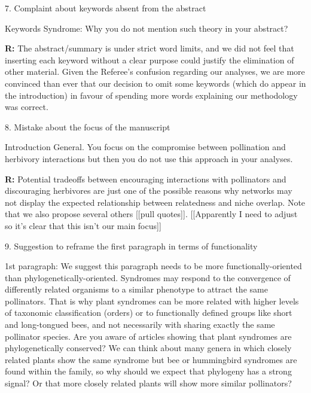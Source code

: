 \documentclass[12pt]{letter}
\newenvironment{refquote}{\bigskip \begin{it}}{\end{it}\smallskip}
\begin{document}
	7. Complaint about keywords absent from the abstract

		\begin{refquote}
		Keywords
		Syndrome:  Why you do not mention such theory in your abstract?
		\end{refquote}


		\textbf{R:} The abstract/summary is under strict word limits, and we did not feel that inserting each keyword without a clear purpose could justify the elimination of other material. Given the Referee's confusion regarding our analyses, we are more convinced than ever that our decision to omit some keywords (which do appear in the introduction) in favour of spending more words explaining our methodology was correct.


	8. Mistake about the focus of the manuscript

		\begin{refquote}
		Introduction
		General. You focus on the compromise between pollination and herbivory interactions but then you do not use this approach in your analyses.
		\end{refquote}


		\textbf{R:} Potential tradeoffs between encouraging interactions with pollinators and discouraging herbivores are just one of the possible reasons why networks may not display the expected relationship between relatedness and niche overlap. Note that we also propose several others [[pull quotes]]. [[Apparently I need to adjust so it's clear that this isn't our main focus]]


	9. Suggestion to reframe the first paragraph in terms of functionality

		\begin{refquote}
		1st paragraph: We suggest this paragraph needs to be more functionally-oriented than phylogenetically-oriented. Syndromes may respond to the convergence of differently related organisms to a similar phenotype to attract the same pollinators. That is why plant syndromes can be more related with higher levels of taxonomic classification (orders) or to functionally defined groups like short and long-tongued bees, and not necessarily with sharing exactly the same pollinator species. Are you aware of articles showing that plant syndromes are phylogenetically conserved? We can think about many genera in which closely related plants show the same syndrome but bee or hummingbird syndromes are found within the family, so why should we expect that phylogeny has a strong signal? Or that more closely related plants will show more similar pollinators?
		\end{refquote}
\end{document}
